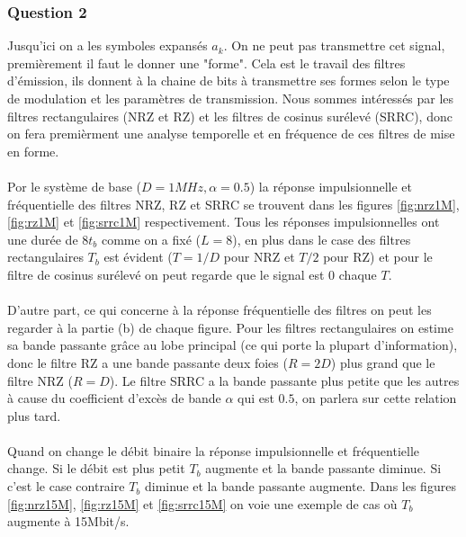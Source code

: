 \documentclass[a4paper,11pt]{article}
\begin{document}
\subsubsection*{Question 2}
Jusqu'ici on a les symboles expansés $a_k$. On ne peut pas transmettre cet signal, premièrement il faut le donner une "forme". Cela est le travail des filtres d'émission, ils donnent à la chaine de bits à transmettre ses formes selon le type de modulation et les paramètres de transmission. Nous sommes intéressés par les filtres rectangulaires (NRZ et RZ) et les filtres de cosinus surélevé (SRRC), donc on fera premièrment une analyse temporelle et en fréquence de ces filtres de mise en forme.\\ \\

Por le système de base ($D=1MHz, \alpha=0.5$) la réponse impulsionnelle et fréquentielle des filtres NRZ, RZ et SRRC se trouvent dans les figures \ref{fig:nrz1M}, \ref{fig:rz1M} et \ref{fig:srrc1M} respectivement. Tous les réponses impulsionnelles ont une durée de $8 t_b$ comme on a fixé ($L=8$), en plus dans le case des filtres rectangulaires $T_b$ est évident ($T= 1/D$ pour NRZ et $T/2$ pour RZ) et pour le filtre de cosinus surélevé on peut regarde que le signal est 0 chaque $T$. \\ \\

D'autre part, ce qui concerne à la réponse fréquentielle des filtres on peut les regarder à la partie (b) de chaque figure. Pour les filtres rectangulaires on estime sa bande passante grâce au lobe principal (ce qui porte la plupart d'information), donc le filtre RZ a une bande passante deux foies ($R=2D$) plus grand que le filtre NRZ ($R=D$). Le filtre SRRC a la bande passante plus petite que les autres à cause du coefficient d'excès de bande $\alpha$ qui est $0.5$, on parlera sur cette relation plus tard.\\ \\

Quand on change le débit binaire la réponse impulsionnelle et fréquentielle change. Si le débit est plus petit $T_b$ augmente et la bande passante diminue. Si c'est le case contraire $T_b$ diminue et la bande passante augmente. Dans les figures \ref{fig:nrz15M}, \ref{fig:rz15M} et \ref{fig:srrc15M} on voie une exemple de cas où $T_b$ augmente à 15Mbit/s.\\ 
\end{document}
